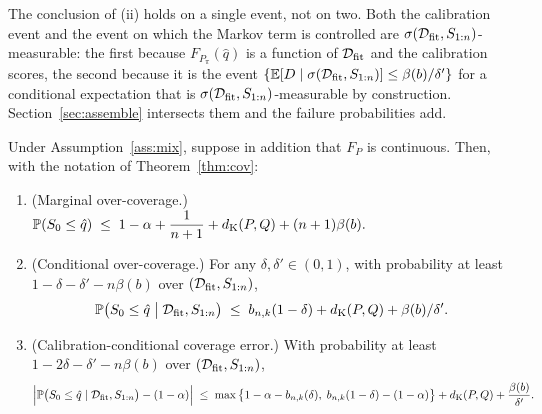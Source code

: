 \documentclass[../../../main.tex]{subfiles}
\begin{document}
The conclusion of (ii) holds on a single event, not on two. Both the calibration event and the event on which the Markov term is controlled are $\sigma(\mathcal D_{\mathrm{fit}},S_{1:n})$-measurable: the first because $F_{P_\pi}(\hat q)$ is a function of $\mathcal D_{\mathrm{fit}}$ and the calibration scores, the second because it is the event $\{\mathbb{E}[D\mid\sigma(\mathcal D_{\mathrm{fit}},S_{1:n})]\le\beta(b)/\delta'\}$ for a conditional expectation that is $\sigma(\mathcal D_{\mathrm{fit}},S_{1:n})$-measurable by construction. Section~\ref{sec:assemble} intersects them and the failure probabilities add.

\begin{proposition}\label{prop:twosided}
Under Assumption~\ref{ass:mix}, suppose in addition that $F_P$ is continuous. Then, with the notation of Theorem~\ref{thm:cov}:
\begin{enumerate}[nosep,label=(\alph*)]
\item (Marginal over-coverage.) $\displaystyle \mathbb{P}(S_0\le\hat q)\;\le\;1-\alpha+\frac1{n+1}+d_{\mathrm{K}}(P,Q)+(n+1)\beta(b).$
\item (Conditional over-coverage.) For any $\delta,\delta'\in(0,1)$, with probability at least $1-\delta-\delta'-n\beta(b)$ over $(\mathcal D_{\mathrm{fit}},S_{1:n})$,
\[
\mathbb{P}\big(S_0\le\hat q\;\big|\;\mathcal D_{\mathrm{fit}},S_{1:n}\big)\;\le\;b_{n,k}(1-\delta)+d_{\mathrm{K}}(P,Q)+\beta(b)/\delta' .
\]
\item (Calibration-conditional coverage error.) With probability at least $1-2\delta-\delta'-n\beta(b)$ over $(\mathcal D_{\mathrm{fit}},S_{1:n})$,
\[
\Big|\mathbb{P}\big(S_0\le\hat q\mid\mathcal D_{\mathrm{fit}},S_{1:n}\big)-(1-\alpha)\Big|
\;\le\;\max\big\{1-\alpha-b_{n,k}(\delta),\;b_{n,k}(1-\delta)-(1-\alpha)\big\}+d_{\mathrm{K}}(P,Q)+\frac{\beta(b)}{\delta'} .
\]
\end{enumerate}
\end{proposition}
\end{document}
